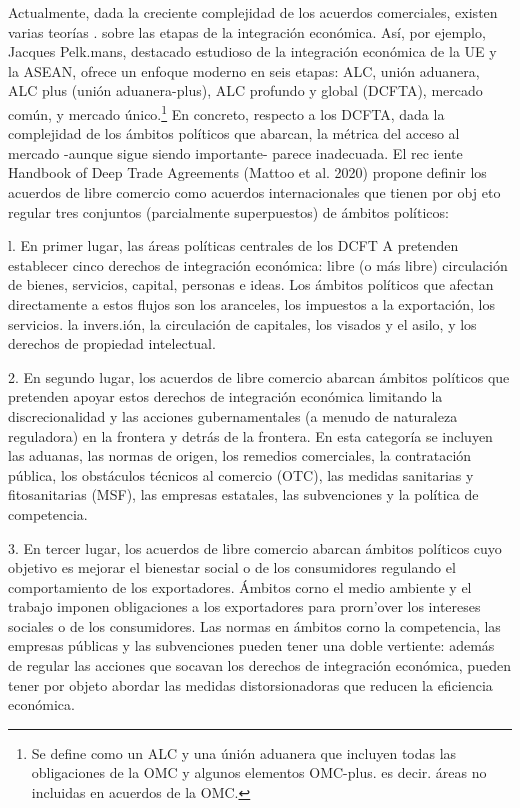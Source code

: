 \documentclass[10pt,a4paper]{article}
\begin{document}
Actualmente, dada la creciente complejidad de los acuerdos comerciales, existen varias teorías . sobre las etapas de la integración económica. Así, por ejemplo, Jacques Pelk.mans, destacado estudioso de la integración económica de la UE y la ASEAN, ofrece un enfoque moderno en seis etapas: ALC, unión aduanera, ALC plus (unión aduanera-plus), ALC profundo y global (DCFTA), mercado común, y mercado único.\footnote{%
    Se define como un ALC y una únión aduanera que incluyen todas las obligaciones de la OMC y algunos elementos OMC-plus. es decir. áreas no incluidas en acuerdos de la OMC.
} En concreto, respecto a los DCFTA, dada la complejidad de los ámbitos políticos que abarcan, la métrica del acceso al mercado -aunque sigue siendo importante- parece inadecuada. El rec iente Handbook of Deep Trade Agreements (Mattoo et al. 2020) propone definir los acuerdos de libre comercio como acuerdos internacionales que tienen por obj eto regular tres conjuntos (parcialmente superpuestos) de ámbitos políticos:

l. En primer lugar, las áreas políticas centrales de los DCFT A pretenden establecer cinco derechos de integración económica: libre (o más libre) circulación de bienes, servicios, capital, personas e ideas. Los ámbitos políticos que afectan directamente a estos flujos son los aranceles, los impuestos a la exportación, los servicios. la invers.ión, la circulación de capitales, los visados y el asilo, y los derechos de propiedad intelectual.

2. En segundo lugar, los acuerdos de libre comercio abarcan ámbitos políticos que pretenden  apoyar estos derechos de integración económica limitando la discrecionalidad y las acciones gubernamentales (a menudo de naturaleza reguladora) en la frontera y detrás de la frontera. En esta categoría se incluyen las aduanas, las normas de origen, los remedios comerciales, la contratación pública, los obstáculos técnicos al comercio (OTC), las medidas sanitarias y fitosanitarias (MSF), las empresas estatales, las subvenciones y la política de competencia.

3. En tercer lugar, los acuerdos de libre comercio abarcan ámbitos políticos cuyo objetivo es mejorar el bienestar social o de los consumidores regulando el comportamiento de los exportadores. Ámbitos corno el medio ambiente y el trabajo imponen obligaciones a los exportadores para prorn'over los intereses sociales o de los consumidores. Las normas en ámbitos corno la competencia, las empresas públicas y las subvenciones pueden tener una doble vertiente: además de regular las acciones que socavan los derechos de integración económica, pueden tener por objeto abordar las medidas distorsionadoras que reducen la eficiencia económica.
\end{document}
